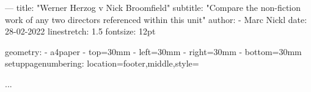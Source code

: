 ---
title: "Werner Herzog v Nick Broomfield"   
subtitle: "Compare the non-fiction work of any two directors referenced within this unit"
author:
  - Marc Nickl
date: 28-02-2022
linestretch: 1.5
fontsize: 12pt

geometry:
   - a4paper
   - top=30mm
   - left=30mm
   - right=30mm
   - bottom=30mm
setuppagenumbering: location={footer,middle},style=\bfc

...


    \



\newpage